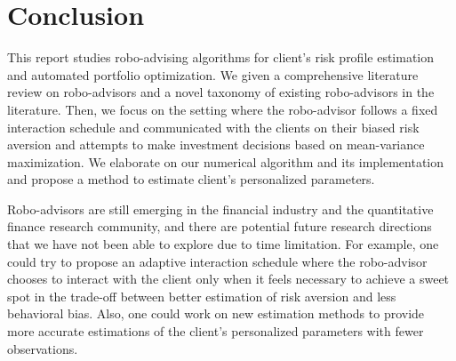 \chapter{Conclusion}\label{sec:conclusion}

This report studies robo-advising algorithms for client's risk profile estimation and automated portfolio optimization. We given a comprehensive literature review on robo-advisors and a novel taxonomy of existing robo-advisors in the literature. Then, we focus on the setting where the robo-advisor follows a fixed interaction schedule and communicated with the clients on their biased risk aversion and attempts to make investment decisions based on mean-variance maximization. We elaborate on our numerical algorithm and its implementation and propose a method to estimate client's personalized parameters.

Robo-advisors are still emerging in the financial industry and the quantitative finance research community, and there are potential future research directions that we have not been able to explore due to time limitation. For example, one could try to propose an adaptive interaction schedule where the robo-advisor chooses to interact with the client only when it feels necessary to achieve a sweet spot in the trade-off between better estimation of risk aversion and less behavioral bias. Also, one could work on new estimation methods to provide more accurate estimations of the client's personalized parameters with fewer observations.